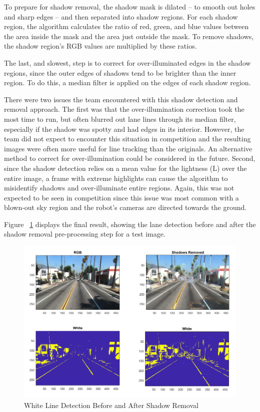 \documentclass[11pt,journal]{IEEEtran}
\begin{document}
To prepare for shadow removal, the shadow mask is dilated – to smooth out holes and sharp edges – and then separated into shadow regions. For each shadow region, the algorithm calculates the ratio of red, green, and blue values between the area inside the mask and the area just outside the mask. To remove shadows, the shadow region's RGB values are multiplied by these ratios.

The last, and slowest, step is to correct for over-illuminated edges in the shadow regions, since the outer edges of shadows tend to be brighter than the inner region. To do this, a median filter is applied on the edges of each shadow region.

There were two issues the team encountered with this shadow detection and removal approach. The first was that the over-illumination correction took the most time to run, but often blurred out lane lines through its median filter, especially if the shadow was spotty and had edges in its interior. However, the team did not expect to encounter this situation in competition and the resulting images were often more useful for line tracking than the originals. An alternative method to correct for over-illumination could be considered in the future. Second, since the shadow detection relies on a mean value for the lightness (L) over the entire image, a frame with extreme highlights can cause the algorithm to misidentify shadows and over-illuminate entire regions. Again, this was not expected to be seen in competition since this issue was most common with a blown-out sky region and the robot's cameras are directed towards the ground.

Figure ~\ref{Shadow6} displays the final result, showing the lane detection before and after the shadow removal pre-processing step for a test image.

\begin{figure}[ht]
\centerline{\includegraphics[width=0.9\columnwidth]{X6.png}}
\caption{White Line Detection Before and After Shadow Removal}
\label{Shadow6}
\end{figure}
\end{document}
